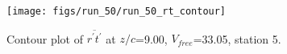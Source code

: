 \begin{figure}[H]
\centering
\texttt{[image: figs/run\_50/run\_50\_rt\_contour]}
\caption{Contour plot of $\overline{r^\prime t^\prime}$ at $z/c$=9.00, $V_{free}$=33.05, station 5.}
\end{figure}


